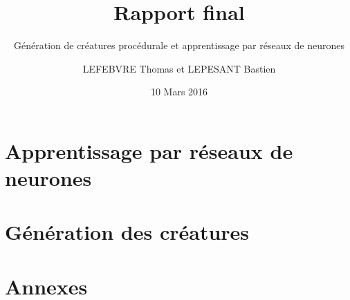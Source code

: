 \documentclass[a4paper, 12pt]{report}
\title{Rapport final}
\subtitle{Génération de créatures procédurale et apprentissage par réseaux de neurones}
\author{LEFEBVRE Thomas et LEPESANT Bastien}
\date{10 Mars 2016}
\begin{document}
\maketitle
\tableofcontents



\part{Apprentissage par réseaux de neurones}


\part{Génération des créatures}







\nocite{*}


\part{Annexes}

\printglossaries
%

\end{document}
